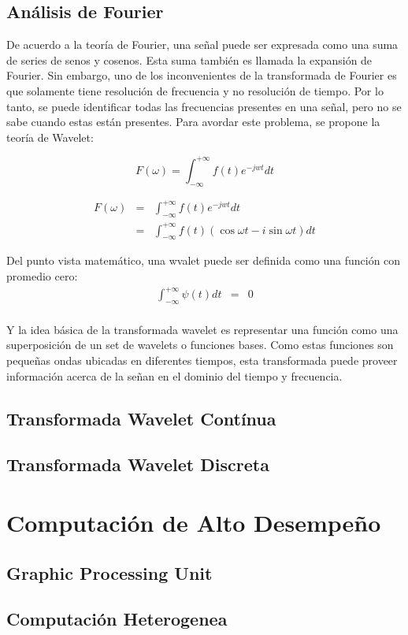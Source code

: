 \subsection{Análisis de Fourier}
De acuerdo a la teoría de Fourier, una señal puede ser expresada como una suma
de series de senos y cosenos. Esta suma también es llamada la expansión de
Fourier. Sin embargo, uno de los inconvenientes de la transformada de Fourier
es que solamente tiene resolución de frecuencia y no resolución de tiempo. Por
lo tanto, se puede identificar todas las frecuencias presentes en una señal,
pero no se sabe cuando estas están presentes. Para avordar este problema, se propone la teoría de Wavelet:

$$
F(\omega) = \int^{+\infty}_{-\infty} f(t)e^{-jwt} dt
$$

\begin{eqnarray*}
	F(\omega)	&=&	\int^{+\infty}_{-\infty} f(t)e^{-jwt}dt \\
				&=&	\int^{+\infty}_{-\infty} f(t)(\cos\omega t - i\sin\omega t)dt
\end{eqnarray*}

Del punto vista matemático, una wvalet puede ser definida como una función con promedio cero:
\begin{eqnarray*}
	\int^{+\infty}_{-\infty} \psi(t)dt &=& 0 \\
\end{eqnarray*}

Y la idea básica de la transformada wavelet es representar una función como una
superposición de un set de wavelets o funciones bases. Como estas funciones son
pequeñas ondas ubicadas en diferentes tiempos, esta transformada puede proveer
información acerca de la señan en el dominio del tiempo y frecuencia.

\subsection{Transformada Wavelet Contínua}
\subsection{Transformada Wavelet Discreta}

\section{Computación de Alto Desempeño}
\subsection{Graphic Processing Unit}
\subsection{Computación Heterogenea}
